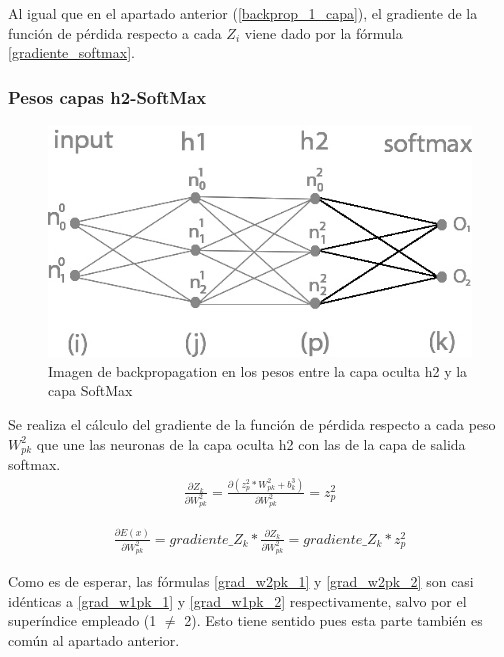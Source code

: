 Al igual que en el apartado anterior (\ref{backprop_1_capa}), el gradiente de la función de pérdida respecto a cada $Z_i$ viene dado por la fórmula \ref{gradiente_softmax}. \\

\subsubsection{Pesos capas h2-SoftMax}

\begin{figure}[H]
	\centering
	\includegraphics[scale=0.35]{imagenes/nn_2_capa_pesos_h2_output.jpg}  
	\caption{Imagen de backpropagation en los pesos entre la capa oculta h2 y la capa SoftMax}
\end{figure}

Se realiza el cálculo del gradiente de la función de pérdida respecto a cada peso $W^2_{pk}$ que une las neuronas de la capa oculta h2 con las de la capa de salida softmax. \\

\begin{gather}
	\frac{\partial Z_k}{\partial W^2_{pk}} = \frac{\partial (z^2_p * W^2 _{pk} + b^3_k)}{\partial W^2_{pk }} = z^2_p 
	\label{grad_w2pk_1}
\end{gather}

\begin{gather}
	\frac{\partial E(x)}{\partial W^2_{pk }} =  gradiente\_Z_k * \frac{\partial Z_k}{\partial W^2_{pk }} = gradiente\_Z_k * z^2_p
	\label{grad_w2pk_2}
\end{gather}

Como es de esperar, las fórmulas \ref{grad_w2pk_1} y \ref{grad_w2pk_2} son casi idénticas a \ref{grad_w1pk_1} y \ref{grad_w1pk_2} respectivamente, salvo por el superíndice empleado (1 $\neq$ 2). Esto tiene sentido pues esta parte también es común al apartado anterior.


